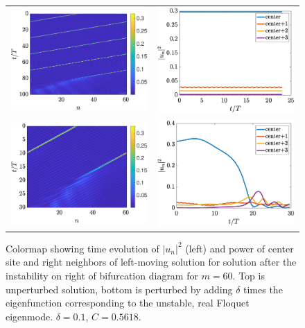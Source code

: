 \documentclass{article}
\begin{document}
\begin{figure}[H]
    \centering
    \begin{tabular}{cc}
    \includegraphics[width=7cm]{leftafterinstabilityRtimestep} &
    \includegraphics[width=7cm]{leftafterinstabilityRpower} \\ 
    \includegraphics[width=7cm]{leftafterinstabilityRperttimestep} &
    \includegraphics[width=7cm]{leftafterinstabilityRpertpower}
    \end{tabular}
    \caption{Colormap showing time evolution of $|u_n|^2$ (left) and power of center site and right neighbors of left-moving solution for solution after the instability on right of bifurcation diagram for $m=60$. Top is unperturbed solution, bottom is perturbed by adding $\delta$ times the eigenfunction corresponding to the unstable, real Floquet eigenmode. $\delta = 0.1$, $C=0.5618$. }
    \label{fig:leftinstabRpert}
\end{figure}
\end{document}
